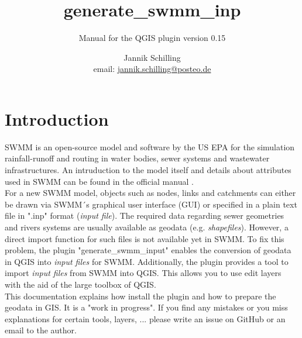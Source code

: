 \documentclass[10pt,a4paper,oneside]{scrbook}
\title{generate\_swmm\_inp}
\subtitle{Manual for the QGIS plugin version 0.15}
\author{Jannik Schilling \\ \small {email: \href{mailto:jannik.schilling@posteo.de}{jannik.schilling@posteo.de}}}
\begin{document}
\maketitle
\tableofcontents

\chapter{Introduction} \label{Introduction}
SWMM is an open-source model and software by the US EPA for the simulation rainfall-runoff and routing in water bodies, sewer systems and wastewater infrastructures. An intruduction to the model itself and details about attributes used in SWMM can be found in the official manual \cite{rossmann2015}. \\
For a new SWMM model, objects such as nodes, links and catchments can either be drawn via SWMM´s graphical user interface (GUI) or specified in a  plain text file in ".inp" format (\textit{input file}). The required data regarding sewer geometries and rivers systems are usually available as geodata (e.g. \textit{shapefiles}). However, a direct import function for such files is not available yet in SWMM. To fix this problem, the plugin "generate\_swmm\_input" enables the conversion of geodata in QGIS into \textit{input files} for SWMM. Additionally, the plugin provides a tool to import \textit{input files} from SWMM into QGIS. This allows you to use edit layers with the aid of the large toolbox of QGIS.\\
This documentation explains how install the plugin and how to prepare the geodata in GIS. It is a "work in progress". If you find any mistakes or you miss explanations for certain tools,  layers, ... please write an issue on GitHub or an email to the author.
\end{document}
